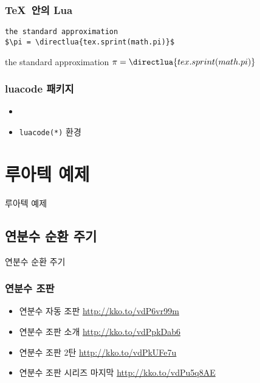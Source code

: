 \documentclass{beamer}
\begin{document}
\begin{frame}[fragile]
  \frametitle{\TeX\ 안의 Lua}
\begin{verbatim}
the standard approximation 
$\pi = \directlua{tex.sprint(math.pi)}$
\end{verbatim}
\begin{center}
  the standard approximation $\pi = \directlua{tex.sprint(math.pi)}$
\end{center}
\end{frame}

\begin{frame}
  \frametitle{\texttt{\string\directlua}}
\end{frame}

\begin{frame}
  \frametitle{luacode 패키지}
  \begin{itemize}
  \item \texttt{\string\luaexec}
  \item \texttt{luacode(*)} 환경
  \end{itemize}
\end{frame}

%
\section{루아텍 예제}

\begin{frame}
  \huge
  \centering 루아텍 예제
\end{frame}


%
\subsection{연분수 순환 주기}

\begin{frame}
  \huge
  \centering 연분수 순환 주기
\end{frame}

\begin{frame}
  \frametitle{연분수 조판}
  \begin{itemize}
  \item 연분수 자동 조판 \url{http://kko.to/vdP6vr99m}
  \item 연분수 조판 소개 \url{http://kko.to/vdPpkDab6}
  \item 연분수 조판 2탄 \url{http://kko.to/vdPkUFe7u}
  \item 연분수 조판 시리즈 마지막 \url{http://kko.to/vdPu5q8AE}
  \end{itemize}
\end{frame}
\end{document}
